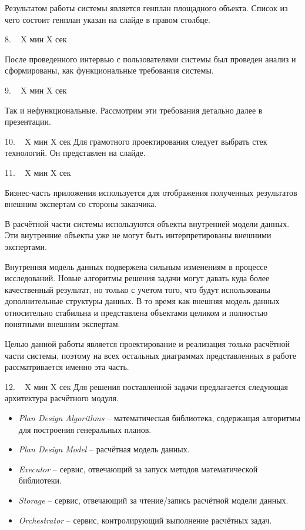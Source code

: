 \documentclass[a4paper,14pt]{extarticle}
\begin{document}
    Результатом работы системы является генплан площадного объекта.
    Список из чего состоит генплан указан на слайде в правом столбце.

    8. ~ X мин X сек

    После проведенного интервью с пользователями системы был проведен анализ и сформированы,
    как функциональные требования системы.

    9. ~ X мин X сек

    Так и нефункциональные.
    Рассмотрим эти требования детально далее в презентации.

    10. ~ X мин X сек
    Для грамотного проектирования следует выбрать стек технологий. Он представлен на слайде.

    11. ~ X мин X сек

    Бизнес-часть приложения используется для отображения полученных результатов внешним экспертам со стороны заказчика.

    В расчётной части системы используются объекты внутренней модели данных.
    Эти внутренние объекты уже не могут быть интерпретированы внешними экспертами.

    Внутренняя модель данных подвержена сильным изменениям в процессе исследований.
    Новые алгоритмы решения задачи могут давать куда более качественный результат, но только с учетом того, что
    будут использованы дополнительные структуры данных. В то время как внешняя модель данных относительно стабильна
    и представлена объектами целиком и полностью понятными внешним экспертам.

    Целью данной работы является проектирование и реализация только расчётной части системы, поэтому на всех остальных
    диаграммах представленных в работе рассматривается именно эта часть.

    12. ~ X мин X сек
    Для решения поставленной задачи предлагается следующая архитектура расчётного модуля.
    \begin{itemize}
        \item \textit{Plan Design Algorithms} -- математическая библиотека, содержащая алгоритмы
        для построения генеральных планов.
        \item \textit{Plan Design Model} -- расчётная модель данных.
        \item \textit{Executor} -- сервис, отвечающий за запуск методов математической библиотеки.
        \item \textit{Storage} -- сервис, отвечающий за чтение/запись расчётной модели данных.
        \item \textit{Orchestrator} -- сервис, контролирующий выполнение расчётных задач.

    \end{itemize}
\end{document}
